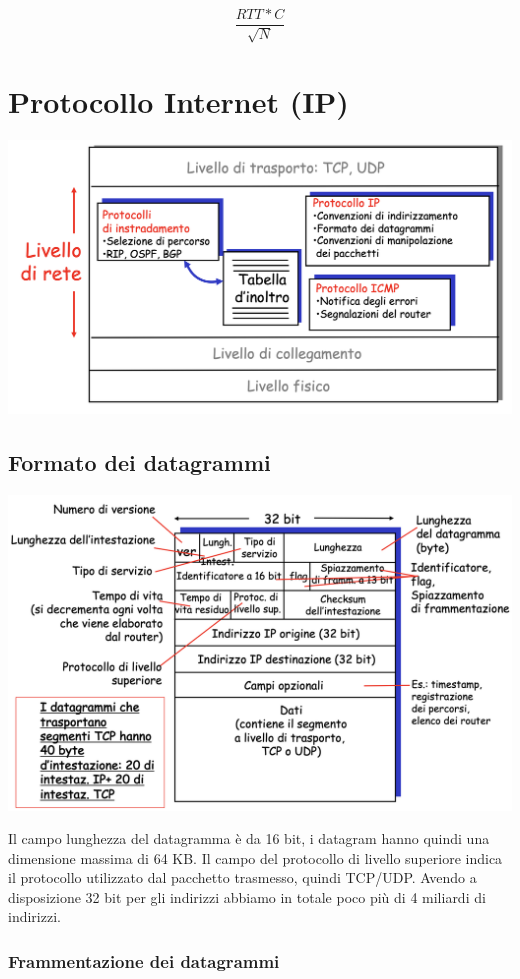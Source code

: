 \documentclass{report}
\begin{document}
\[\frac{RTT*C}{\sqrt{N}}\]

\hypertarget{header-n86}{%
\section{Protocollo Internet (IP)}\label{header-n86}}

\begin{center}
		\includegraphics[width=0.7\linewidth]{liv-rete}
	\end{center}

\hypertarget{header-n88}{%
\subsection{Formato dei datagrammi}\label{header-n88}}

\begin{center}
		\includegraphics[width=0.7\linewidth]{datagram-ip}
	\end{center}

Il campo lunghezza del datagramma è da 16 bit, i datagram  hanno quindi una dimensione massima
di 64 KB. Il campo del protocollo di livello superiore indica il
protocollo utilizzato dal pacchetto trasmesso, quindi TCP/UDP. Avendo a
disposizione 32 bit per gli indirizzi abbiamo in totale poco più di 4
miliardi di indirizzi.

\hypertarget{header-n91}{%
\subsubsection{Frammentazione dei datagrammi}\label{header-n91}}
\end{document}
